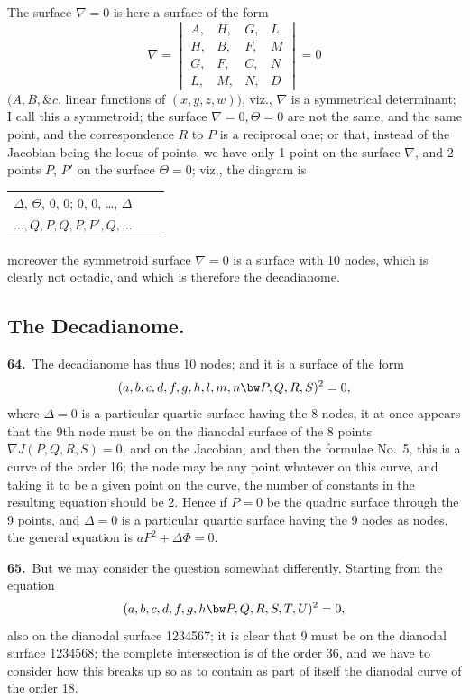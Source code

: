 \documentclass[11pt,a4paper]{article}
\begin{document}
The surface $\nabla = 0$ is here a surface of the form
\[
\nabla = \begin{vmatrix}
A, & H, & G, & L\\
H, & B, & F, & M\\
G, & F, & C, & N\\
L, & M, & N, & D
\end{vmatrix} = 0
\]
$(A, B, \&c.$ linear functions of $(x, y, z, w))$, viz., $\nabla$ is a symmetrical determinant; I call this a symmetroid; the surface $\nabla = 0, \Theta = 0$ are not the same, and the same point, and the correspondence $R$ to $P$ is a reciprocal one; or that, instead of the Jacobian being the locus of points, we have only 1 point on the surface $\nabla$, and 2 points $P$, $P'$ on the surface $\Theta = 0$; viz., the diagram is
\begin{center}
\begin{tabular}{ccc}
$\Delta$, $\Theta$, 0, 0; 0, 0, \ldots, $\Delta$\\
$\ldots, Q, P, Q, P, P', Q, \ldots$
\end{tabular}
\end{center}
moreover the symmetroid surface $\nabla = 0$ is a surface with 10 nodes, which is clearly not octadic, and which is therefore the decadianome.

\newpage
\setcounter{page}{157}

\subsection*{The Decadianome.}

\noindent\textbf{64.}\ The decadianome has thus 10 nodes; and it is a surface of the form
\[
(a, b, c, d, f, g, h, l, m, n \bw P, Q, R, S)^2 = 0,
\]
where $\Delta = 0$ is a particular quartic surface having the 8 nodes, it at once appears that the 9th node must be on the dianodal surface of the 8 points $\nabla J(P, Q, R, S) = 0$, and on the Jacobian; and then the formulae No.\ 5, this is a curve of the order 16; the node may be any point whatever on this curve, and taking it to be a given point on the curve, the number of constants in the resulting equation should be 2. Hence if $P = 0$ be the quadric surface through the 9 points, and $\Delta = 0$ is a particular quartic surface having the 9 nodes as nodes, the general equation is $aP^2 + \Delta\Phi = 0$.

\medskip

\textbf{65.}\ But we may consider the question somewhat differently. Starting from the equation
\[
(a, b, c, d, f, g, h \bw P, Q, R, S, T, U)^2 = 0,
\]
also on the dianodal surface 1234567; it is clear that 9 must be on the dianodal surface 1234568; the complete intersection is of the order 36, and we have to consider how this breaks up so as to contain as part of itself the dianodal curve of the order 18.
\end{document}
